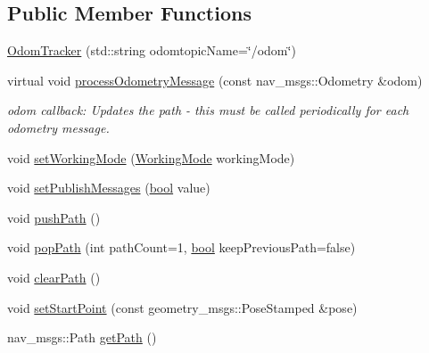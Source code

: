 \subsection*{Public Member Functions}
\begin{DoxyCompactItemize}
\item 
\hyperlink{classcl__move__base__z_1_1odom__tracker_1_1OdomTracker_ae3a5615aa45b7acf11e650e98ab10950}{Odom\+Tracker} (std\+::string odomtopic\+Name=\char`\"{}/odom\char`\"{})
\item 
virtual void \hyperlink{classcl__move__base__z_1_1odom__tracker_1_1OdomTracker_a12c5a839cfde2e8f2f55a5e0c9647b18}{process\+Odometry\+Message} (const nav\+\_\+msgs\+::\+Odometry \&odom)
\begin{DoxyCompactList}\small\item\em odom callback\+: Updates the path -\/ this must be called periodically for each odometry message. \end{DoxyCompactList}\item 
void \hyperlink{classcl__move__base__z_1_1odom__tracker_1_1OdomTracker_aeed01bdefd9a1cc709b0b3e4eed285ed}{set\+Working\+Mode} (\hyperlink{namespacecl__move__base__z_1_1odom__tracker_ac46b05813b2791604f6cd0a39ace3ef8}{Working\+Mode} working\+Mode)
\item 
void \hyperlink{classcl__move__base__z_1_1odom__tracker_1_1OdomTracker_a3b3cf9010e4e4fe4f96cfafd5a529517}{set\+Publish\+Messages} (\hyperlink{classbool}{bool} value)
\item 
void \hyperlink{classcl__move__base__z_1_1odom__tracker_1_1OdomTracker_a205ee48ec8b4599658e7408fc4755239}{push\+Path} ()
\item 
void \hyperlink{classcl__move__base__z_1_1odom__tracker_1_1OdomTracker_a2749e5cd0443423d50864a0166b078b9}{pop\+Path} (int path\+Count=1, \hyperlink{classbool}{bool} keep\+Previous\+Path=false)
\item 
void \hyperlink{classcl__move__base__z_1_1odom__tracker_1_1OdomTracker_a93a14e15e3e623f530e056f403bf7644}{clear\+Path} ()
\item 
void \hyperlink{classcl__move__base__z_1_1odom__tracker_1_1OdomTracker_a9f4989c6353022c2ec3b0546c09bf3bc}{set\+Start\+Point} (const geometry\+\_\+msgs\+::\+Pose\+Stamped \&pose)
\item 
nav\+\_\+msgs\+::\+Path \hyperlink{classcl__move__base__z_1_1odom__tracker_1_1OdomTracker_a762bc88653ebb7d78e693ba465fb160f}{get\+Path} ()
\end{DoxyCompactItemize}
